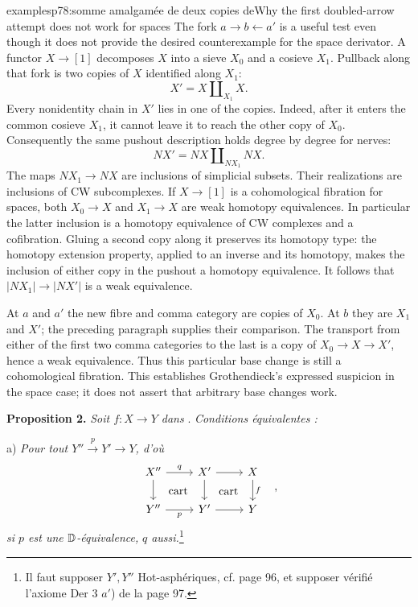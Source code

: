 \begin{dcomment}{examples}{p78:somme amalgamée de deux copies de}{Why the first doubled-arrow attempt does not work for spaces}
The fork $a\to b\leftarrow a'$ is a useful test even though it does not provide the desired counterexample for the space derivator. A functor $X\to[1]$ decomposes $X$ into a sieve $X_0$ and a cosieve $X_1$. Pullback along that fork is two copies of $X$ identified along $X_1$:
\[
 X'=X\amalg_{X_1}X.
\]
Every nonidentity chain in $X'$ lies in one of the copies. Indeed, after it enters the common cosieve $X_1$, it cannot leave it to reach the other copy of $X_0$. Consequently the same pushout description holds degree by degree for nerves:
\[
 NX'=NX\amalg_{NX_1}NX.
\]
The maps $NX_1\to NX$ are inclusions of simplicial subsets. Their realizations are inclusions of CW subcomplexes. If $X\to[1]$ is a cohomological fibration for spaces, both $X_0\to X$ and $X_1\to X$ are weak homotopy equivalences. In particular the latter inclusion is a homotopy equivalence of CW complexes and a cofibration. Gluing a second copy along it preserves its homotopy type: the homotopy extension property, applied to an inverse and its homotopy, makes the inclusion of either copy in the pushout a homotopy equivalence. It follows that $|NX_1|\to|NX'|$ is a weak equivalence.

At $a$ and $a'$ the new fibre and comma category are copies of $X_0$. At $b$ they are $X_1$ and $X'$; the preceding paragraph supplies their comparison. The transport from either of the first two comma categories to the last is a copy of $X_0\to X\to X'$, hence a weak equivalence. Thus this particular base change is still a cohomological fibration. This establishes Grothendieck's expressed suspicion in the space case; it does not assert that arbitrary base changes work.
\end{dcomment}



\textbf{Proposition 2.} \textit{Soit $f : X \to Y$ dans} \Dia. \textit{Conditions équivalentes :}

\hspace*{\parindent}a) \textit{Pour tout $Y'' \overset{p}{\to} Y' \to Y$, d'où}
\[
\begin{tikzcd}
X'' \arrow[r, "q"] \arrow[d] \arrow[dr, phantom, "\text{cart}"] & X' \arrow[r] \arrow[d] \arrow[dr, phantom, "\text{cart}"] & X \arrow[d, "f"] \\
Y'' \arrow[r, "p"'] & Y' \arrow[r] & Y
\end{tikzcd}
\quad ,
\]
\textit{si $p$ est une $\mathbb{D}$-équivalence,} \textit{$q$ aussi.}\footnote[35]{Il faut supposer $Y', Y''$ \textsf{Hot}-asphériques, cf. page 96, et supposer vérifié l'axiome Der 3 $a'$) de la page 97.}

